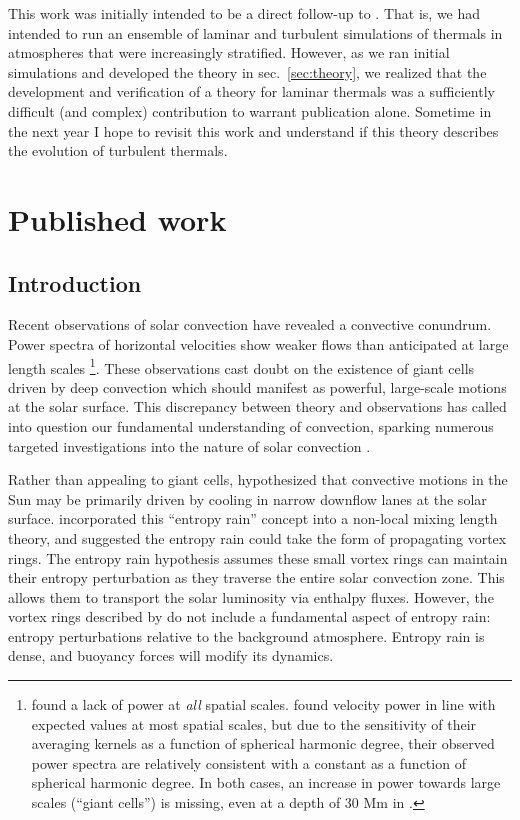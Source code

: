This work was initially intended to be a direct follow-up to \citet{lecoanet&jeevanjee2019}.
That is, we had intended to run an ensemble of laminar and turbulent simulations of thermals in atmospheres that were increasingly stratified.
However, as we ran initial simulations and developed the theory in sec.~\ref{sec:theory}, we realized that the development and verification of a theory for laminar thermals was a sufficiently difficult (and complex) contribution to warrant publication alone.
Sometime in the next year I hope to revisit this work and understand if this theory describes the evolution of turbulent thermals.


\section{Published work}
\label{sec:alb19_published}

\subsection{Introduction}
\label{sec:intro}
Recent observations of solar convection have revealed a convective conundrum.
Power spectra of horizontal velocities show weaker flows than anticipated at large length scales \citep{hanasoge&all2012, greer&all2015}\footnote{
\citet{hanasoge&all2012} found a lack of power at \emph{all} spatial scales. 
\citet{greer&all2015} found velocity power in line with expected values at most spatial scales, but due to the sensitivity of their averaging kernels as a function of spherical harmonic degree, their observed power spectra are relatively consistent with a constant as a function of spherical harmonic degree. 
In both cases, an increase in power towards large scales (``giant cells'') is missing, even at a depth of 30 Mm in \citet{greer&all2015}.}.
These observations cast doubt on the existence of giant cells driven by deep convection which should manifest as powerful, large-scale motions at the solar surface. 
This discrepancy between theory and observations has called into question our fundamental understanding of convection, sparking numerous targeted investigations into the nature of solar convection  \citep{featherstone&hindman2016a, omara&all2016, cossette&rast2016, kapyla&all2017, hotta2017}.

Rather than appealing to giant cells, \citet{spruit1997} hypothesized that convective motions in the Sun may be primarily driven by cooling in narrow downflow lanes at the solar surface.
\citet{brandenburg2016} incorporated this ``entropy rain'' concept into a non-local mixing length theory, and suggested the entropy rain could take the form of propagating vortex rings.
The entropy rain hypothesis assumes these small vortex rings can maintain their entropy perturbation as they traverse the entire solar convection zone.
This allows them to transport the solar luminosity via enthalpy fluxes.
However, the vortex rings described by \citet{brandenburg2016} do not include a fundamental aspect of entropy rain: entropy perturbations relative to the background atmosphere.
Entropy rain is dense, and buoyancy forces will modify its dynamics.

